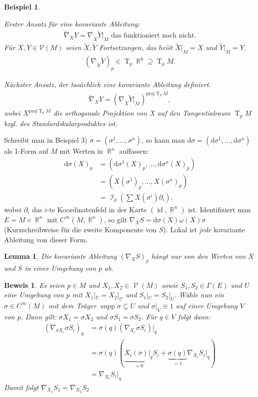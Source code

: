 \documentclass[paper=A4, twoside, chapterprefix=true, bibliography=totoc, headsepline]{scrbook}
\DeclareMathOperator{\R}{\mathbb{R}}
\DeclareMathOperator{\calI}{\mathcal{I}}
\DeclareMathOperator{\calV}{\mathcal{V}}
\DeclareMathOperator{\supp}{supp}   %
\DeclareMathOperator{\Id}{id}       %
\DeclareMathOperator{\T}{T}         %
\newcommand{\dop}{\mathrm{d}}
\newcommand{\X}{\times}
\theoremstyle{plain}
\newtheorem{Lemma}[Dfn]{Lemma}
\theoremstyle{nonumberplain}
\newtheorem{bsp}{Beispiel}
\newtheorem{bew}{Beweis}
\theoremstyle{empty}
\theoremstyle{break}
\begin{document}
\begin{bsp}
\begin{enumerate}[label=(\arabic*),leftmargin=*]
    Erster Ansatz f\"ur eine kovariante Ableitung:
    \begin{align*}
      \tilde \nabla_XY = \nabla_{\tilde X}\tilde Y|_M \text{ das funktioniert noch nicht.}
    \end{align*}
    F\"ur $X,Y \in \mathcal V(M)$ seien $\tilde X, \tilde Y$ Fortsetzungen, das hei\"st $\tilde X|_M = X$ und $\tilde Y|_M = Y$.
    \begin{align*}
      (\nabla_{\tilde X}\tilde Y)_p \in \T_p\R^k \supseteq \T_pM.
    \end{align*}

    N\"achster Ansatz, der tas\"achlich eine kovariante Ableitung definiert.
    \begin{align*}
      \tilde \nabla_XY = (\nabla_{\tilde X}\tilde Y|_M)^{\text{proj}\T_pM},
    \end{align*}
    wobei $X^{\text{proj}\T_pM}$ die orthogonale Projektion von X auf den Tangentialraum $\T_pM$ bzgl. des Standardskalarproduktes ist.
  \end{enumerate}
\end{bsp}

Schreibt man in Beispiel 3) $\sigma = ( \sigma^1, \ldots ,\sigma^n)$, so kann man $\dop \sigma = (\dop \sigma^1,\ldots ,\dop\sigma^n)$ als 1-Form auf $M$ mit Werten in $\R^n$ auffassen:
\begin{align*}
  \dop \sigma(X)_p &= (\dop \sigma^1(X)_p,\ldots , \dop \sigma^n(X)_p)\\
  &= (X(\sigma^1)_p,\ldots ,X(\sigma^n)_p)\\
  &= \calI_p(\sum X(\sigma^{i}) \partial_i),
\end{align*}
wobei $\partial_i$ das $i$-te Koordinatenfeld in der Karte $(\Id, \R^n)$ ist.
Identifiziert man $E = M \X \R^n$ mit $C^{\infty}(M, \R^n)$, so gilt $\nabla_X S = \dop \sigma(X) \omega(X) \sigma$ (Kurzschreibweise f\"ur die zweite Komponente von $S$). 
Lokal ist \emph{jede} kovariante Ableitung von dieser Form.

\begin{Lemma}
  Die kovariante Ableitung $(\nabla_XS)_p$ h\"angt nur von den Werten von $X$ und $S$ in einer Umgebung von $p$ ab.
\end{Lemma}

\begin{bew}
  Es seien $p \in M$ und $X_1, X_2 \in \calV(M)$ sowie $S_1, S_2 \in \Gamma(E)$ und $U$ eine Umgebung von $p$ mit $X_1|_U = X_2|_U$ und $S_1|_U = S_2|_U$. 
  W\"ahle nun ein $\sigma \in C^{\infty}(M)$ mit dem Tr\"ager $\supp \sigma \subseteq U$ und $\sigma|_V \equiv 1$ auf einer Umgebung $V$ von $p$.
  Dann gilt: $\sigma X_1 = \sigma X_2$ und $\sigma S_1 = \sigma S_2$. F\"ur $q \in V$ folgt dann:
  \begin{align*}
    (\nabla_{\sigma X_i} \sigma S_i)_q &= \sigma(q)(\nabla_{X_i} \sigma S_i)|_q\\
    &= \sigma(q)(\underbrace{X_i(\sigma)|_q}_{=0} S_i + \underbrace{\sigma(q)}_{=1}\nabla_{X_i} S_i|_q)\\
    &= \nabla_{X_i} S_i|_q
  \end{align*}
  Damit folgt $\nabla_{X_1} S_1 = \nabla_{X_2} S_2$
\end{bew}
\end{document}
